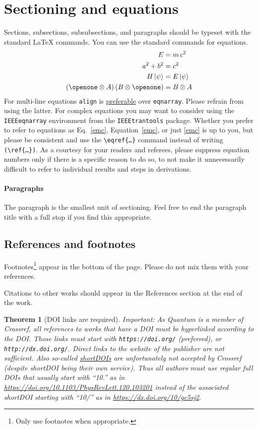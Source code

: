 \documentclass[a4paper,twocolumn,11pt,accepted=2017-05-09]{quantumarticle}
\newtheorem{theorem}{Theorem}
\begin{document}
\section{Sectioning and equations}
Sections, subsections, subsubsections, and paragraphs should be typeset with the standard LaTeX commands.
You can use the standard commands for equations.
\begin{align}
  \label{emc}
  E &= m\,c^2\\
  a^2 + b^2 &= c^2\\
  H\,|\psi\rangle &= E\,|\psi\rangle\\
  (\openone \otimes A)\,(B \otimes \openone) &= B \otimes A
\end{align}
For multi-line equations \texttt{align} is \href{http://tex.stackexchange.com/questions/196/eqnarray-vs-align}{preferable} over \texttt{eqnarray}.
Please refrain from using the latter.
For complex equations you may want to consider using the \texttt{IEEEeqnarray} environment from the \texttt{IEEEtrantools} package.
Whether you prefer to refer to equations as Eq.~\eqref{emc}, Equation~\ref{emc}, or just \eqref{emc} is up to you, but please be consistent and use the \texttt{\textbackslash{}eqref\{\dots\}} command instead of writing \texttt{(\textbackslash{}ref\{\dots\})}.
As a courtesy for your readers and referees, please suppress equation numbers only if there is a specific reason to do so, to not make it unnecessarily difficult to refer to individual results and steps in derivations.

\paragraph{Paragraphs}
The paragraph is the smallest unit of sectioning.
Feel free to end the paragraph title with a full stop if you find this appropriate.

\subsection{References and footnotes}
\label{sec:subsec1}
Footnotes\footnote{Only use footnotes when appropriate.} appear in the bottom of the page.
Please do not mix them with your references.

Citations to other works should appear in the References section at the end of the work.

\begin{theorem}[DOI links are required]
  Important: As Quantum is a member of Crossref, all references to works that have a DOI must be hyperlinked according to the DOI. Those links must start with \texttt{https://doi.org/} (preferred), or \texttt{http://dx.doi.org/}. Direct links to the website of the publisher are not sufficient. Also so-called \href{https://shortdoi.org/}{shortDOIs} are unfortunately not accepted by Crossref (despite shortDOI being their own service). Thus all authors must use regular full DOIs that usually start with \mbox{``10.''} as in \url{https://doi.org/10.1103/PhysRevLett.120.103201} instead of the associated shortDOI starting with \mbox{``10/''} as in \url{https://dx.doi.org/10/gc5sj2}.
\end{theorem}
\end{document}
